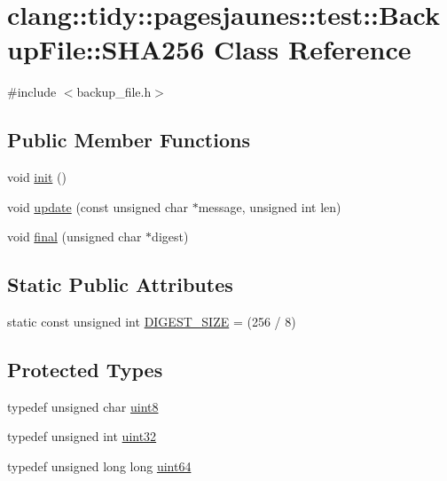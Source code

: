 \hypertarget{classclang_1_1tidy_1_1pagesjaunes_1_1test_1_1_backup_file_1_1_s_h_a256}{}\section{clang\+:\+:tidy\+:\+:pagesjaunes\+:\+:test\+:\+:Backup\+File\+:\+:S\+H\+A256 Class Reference}
\label{classclang_1_1tidy_1_1pagesjaunes_1_1test_1_1_backup_file_1_1_s_h_a256}


{\ttfamily \#include $<$backup\+\_\+file.\+h$>$}

\subsection*{Public Member Functions}
\begin{DoxyCompactItemize}
\item 
void \hyperlink{classclang_1_1tidy_1_1pagesjaunes_1_1test_1_1_backup_file_1_1_s_h_a256_ab3f4a220a3cb829f17b18fac80d3dfa5}{init} ()
\item 
void \hyperlink{classclang_1_1tidy_1_1pagesjaunes_1_1test_1_1_backup_file_1_1_s_h_a256_acda3e7e2e990f3f2662be522dbcf5157}{update} (const unsigned char $\ast$message, unsigned int len)
\item 
void \hyperlink{classclang_1_1tidy_1_1pagesjaunes_1_1test_1_1_backup_file_1_1_s_h_a256_a03f35e13e8e122fef9e97e0fc1864307}{final} (unsigned char $\ast$digest)
\end{DoxyCompactItemize}
\subsection*{Static Public Attributes}
\begin{DoxyCompactItemize}
\item 
static const unsigned int \hyperlink{classclang_1_1tidy_1_1pagesjaunes_1_1test_1_1_backup_file_1_1_s_h_a256_a45cb3f952719c0ac45c4cda10dc7fa85}{D\+I\+G\+E\+S\+T\+\_\+\+S\+I\+ZE} = (256 / 8)
\end{DoxyCompactItemize}
\subsection*{Protected Types}
\begin{DoxyCompactItemize}
\item 
typedef unsigned char \hyperlink{classclang_1_1tidy_1_1pagesjaunes_1_1test_1_1_backup_file_1_1_s_h_a256_a5a75dfea000f4f93bd28fd7c8842e661}{uint8}
\item 
typedef unsigned int \hyperlink{classclang_1_1tidy_1_1pagesjaunes_1_1test_1_1_backup_file_1_1_s_h_a256_ad36a1d5021aca69fa0d2de1f98c1ebe6}{uint32}
\item 
typedef unsigned long long \hyperlink{classclang_1_1tidy_1_1pagesjaunes_1_1test_1_1_backup_file_1_1_s_h_a256_a31d595fc4730d7d85745c0a77fec16e6}{uint64}
\end{DoxyCompactItemize}
